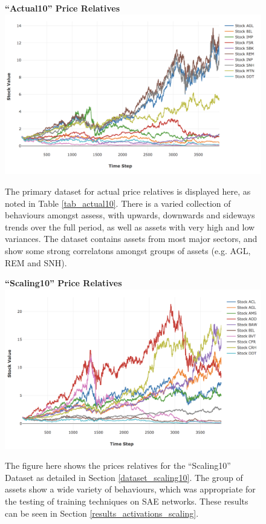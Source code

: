 \documentclass[a4paper,11pt,oneside]{article}
\theoremstyle{plain}
\theoremstyle{definition}
\begin{document}
	\begin{figure}[H]
		\centering
		\textbf{``Actual10'' Price Relatives}
		\includegraphics[scale=0.45]{images/results/prices/actual10_prices.png} 
		\caption[``Actual10'' Price Relatives]{The primary dataset for actual price relatives is displayed here, as noted in Table \ref{tab_actual10}. There is a varied collection of behaviours amongst assess, with upwards, downwards and sideways trends over the full period, as well as assets with very high and low variances. The dataset contains assets from most major sectors, and show some strong correlatons amongst groups of assets (e.g. AGL, REM and SNH). }
		\label{figure-actual10_prices}
	\end{figure}
	
	\begin{figure}[H]
		\centering
		\textbf{``Scaling10'' Price Relatives}
		\includegraphics[scale=0.45]{images/results/prices/scaling10_prices.png} 
		\caption[`Scaling10'' Price Relatives]{The figure here shows the prices relatives for the ``Scaling10'' Dataset as detailed in Section \ref{dataset_scaling10}. The group of assets show a wide variety of behaviours, which was appropriate for the testing of training techniques on SAE networks. These results can be seen in Section \ref{results_activations_scaling}.}
		\label{figure-scaling10_prices}
	\end{figure}
	
\end{document}
